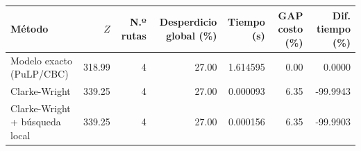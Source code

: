 \begin{tabular}{lrrrrrr}
\toprule
Método & $Z$ & N.º rutas & Desperdicio global (\%) & Tiempo (s) & GAP costo (\%) & Dif. tiempo (\%) \\
\midrule
Modelo exacto (PuLP/CBC) & 318.99 & 4 & 27.00 & 1.614595 & 0.00 & 0.0000 \\
Clarke-Wright & 339.25 & 4 & 27.00 & 0.000093 & 6.35 & -99.9943 \\
Clarke-Wright + búsqueda local & 339.25 & 4 & 27.00 & 0.000156 & 6.35 & -99.9903 \\
\bottomrule
\end{tabular}

